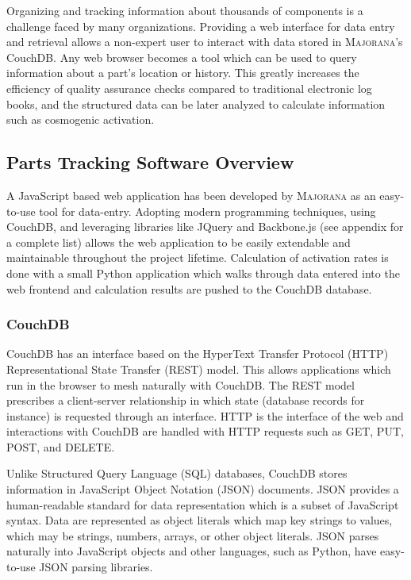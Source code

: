 \documentclass[journal]{IEEEtran}
\begin{document}
Organizing and tracking information about thousands of components is a
challenge faced by many organizations. Providing a web interface for data entry and retrieval allows
a non-expert user to interact with data stored in \textsc{Majorana}'s CouchDB. Any web browser becomes a tool which can
be used to query information about a part's location or history. This greatly increases the efficiency of quality assurance
checks compared to traditional electronic log books, and the structured data can be later analyzed to calculate information
such as cosmogenic activation.

\subsection{Parts Tracking Software Overview}
A JavaScript based web application has been developed by \textsc{Majorana} as an easy-to-use tool for data-entry.
Adopting modern programming techniques, using CouchDB, and leveraging libraries like JQuery and Backbone.js (see appendix for a complete list) allows the
web application to be easily extendable and maintainable throughout the project lifetime. Calculation of
activation rates is done with a small Python application which walks through data entered into the web
frontend and calculation results are pushed to the CouchDB database.

\subsubsection{CouchDB}
CouchDB has an interface based on the HyperText Transfer Protocol (HTTP) Representational State Transfer (REST) model.
This allows applications which run in the browser to mesh naturally with CouchDB.
The REST model prescribes a client-server
relationship in which state (database records for instance) is requested through an interface.
HTTP is the interface of the web and interactions with CouchDB are handled with HTTP
requests such as GET, PUT, POST, and DELETE. 

Unlike Structured Query Language (SQL) databases, CouchDB stores information in JavaScript Object Notation (JSON) \cite{json}
documents.
JSON provides a human-readable
standard for data representation which is a subset of JavaScript syntax. Data are represented as object
literals which map key strings to values, which may be strings, numbers, arrays, or other object literals. 
JSON parses naturally into JavaScript objects and other languages, such as Python, have easy-to-use
JSON parsing libraries. 
\end{document}
